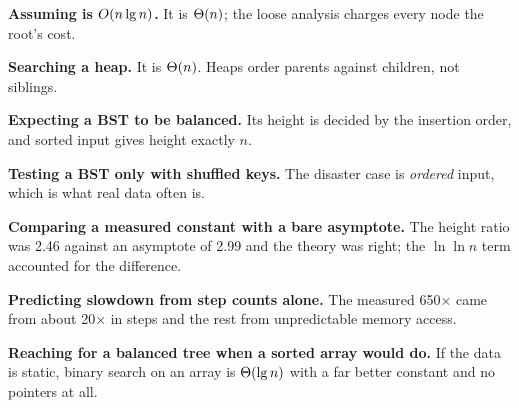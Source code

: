 \begin{pitfall}
\begin{tight}
  \item \textbf{Assuming  is $O(n\operatorname{lg} n)$.} It is
        $\Theta(n)$; the loose analysis charges every node the root's cost.
  \item \textbf{Searching a heap.} It is $\Theta(n)$. Heaps order parents
        against children, not siblings.
  \item \textbf{Expecting a BST to be balanced.} Its height is decided by the
        insertion order, and sorted input gives height exactly $n$.
  \item \textbf{Testing a BST only with shuffled keys.} The disaster case is
        \emph{ordered} input, which is what real data often is.
  \item \textbf{Comparing a measured constant with a bare asymptote.} The
        height ratio was 2.46 against an asymptote of 2.99 and the theory was
        right; the $\ln\ln n$ term accounted for the difference.
  \item \textbf{Predicting slowdown from step counts alone.} The measured 650×
        came from about 20× in steps and the rest from unpredictable memory
        access.
  \item \textbf{Reaching for a balanced tree when a sorted array would do.} If
        the data is static, binary search on an array is $\Theta(\operatorname{lg} n)$ with a
        far better constant and no pointers at all.
\end{tight}
\end{pitfall}

